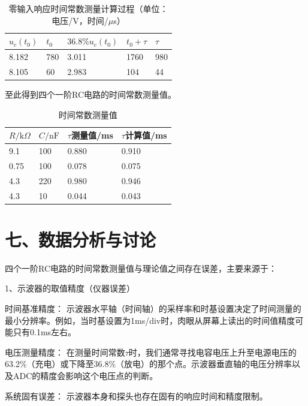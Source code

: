 \documentclass[12pt,a4paper]{article}
\begin{document}
\begin{table}[H]
\centering
\caption{零输入响应时间常数测量计算过程（单位：电压/V，时间/$\mu$s）} 
\renewcommand{\arraystretch}{1.2}
\small
\begin{tabular}{|p{1.2cm}|p{1.2cm}|p{2cm}|p{1.2cm}|p{1.2cm}|}
\hline
 $u_{c}(t_0)$ & $t_0$ &$36.8\%u_{c}(t_0)$& $t_0+\tau$ & $\tau$ \\
\hline
8.182 &780 &3.011 &1760 &980 \\
\hline
8.105 &60 &2.983 &104 &44 \\
\hline

\end{tabular}

\end{table}

至此得到四个一阶RC电路的时间常数测量值。

\begin{table}[H]
\centering
\caption{时间常数测量值} 
\renewcommand{\arraystretch}{1.2}
\small
\begin{tabular}{|p{1.2cm}|p{1.2cm}|p{2.4cm}|p{2.4cm}|}
\hline
 $R/\mathrm{k}\Omega$ & $C/\mathrm{nF}$ & $\tau$测量值/ms& $\tau$计算值/ms\\
\hline
9.1 & 100 & 0.880 & 0.910 \\
\hline
0.75 & 100 & 0.078 & 0.075\\
\hline
4.3 & 220 & 0.980 & 0.946 \\
\hline
4.3 & 10 & 0.044 & 0.043\\
\hline
\end{tabular}

\end{table}

\section*{七、数据分析与讨论}

四个一阶RC电路的时间常数测量值与理论值之间存在误差，主要来源于：

1、示波器的取值精度（仪器误差）

时间基准精度： 示波器水平轴（时间轴）的采样率和时基设置决定了时间测量的最小分辨率。例如，当时基设置为1ms/div时，肉眼从屏幕上读出的时间值精度可能只有0.1ms左右。

电压测量精度： 在测量时间常数$\tau$时，我们通常寻找电容电压上升至电源电压的63.2\%（充电）或下降至36.8\%（放电）的那个点。示波器垂直轴的电压分辨率以及ADC的精度会影响这个电压点的判断。

系统固有误差： 示波器本身和探头也存在固有的响应时间和精度限制。
\end{document}
